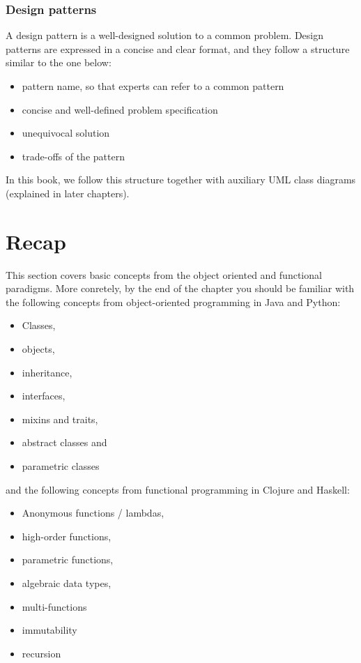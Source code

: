 \documentclass[]{article}
\providecommand{\tightlist}{%
  \setlength{\itemsep}{0pt}\setlength{\parskip}{0pt}}
\begin{document}
\subsubsection{Design patterns}\label{design-patterns}

A design pattern is a well-designed solution to a common problem. Design
patterns are expressed in a concise and clear format, and they follow a
structure similar to the one below:

\begin{itemize}
\tightlist
\item
  pattern name, so that experts can refer to a common pattern
\item
  concise and well-defined problem specification
\item
  unequivocal solution
\item
  trade-offs of the pattern
\end{itemize}

In this book, we follow this structure together with auxiliary UML class
diagrams (explained in later chapters).

\section{Recap}\label{recap}

This section covers basic concepts from the object oriented and
functional paradigms. More conretely, by the end of the chapter you
should be familiar with the following concepts from object-oriented
programming in Java and Python:

\begin{itemize}
\tightlist
\item
  Classes,
\item
  objects,
\item
  inheritance,
\item
  interfaces,
\item
  mixins and traits,
\item
  abstract classes and
\item
  parametric classes
\end{itemize}

and the following concepts from functional programming in Clojure and
Haskell:

\begin{itemize}
\tightlist
\item
  Anonymous functions / lambdas,
\item
  high-order functions,
\item
  parametric functions,
\item
  algebraic data types,
\item
  multi-functions
\item
  immutability
\item
  recursion
\end{itemize}
\end{document}
